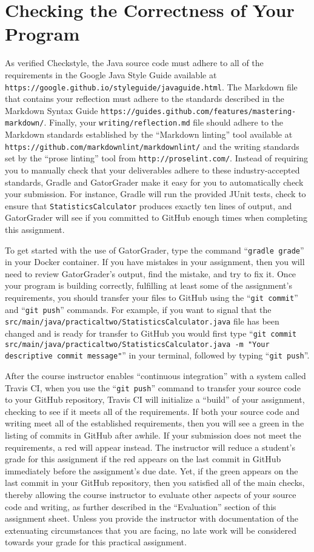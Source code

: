 \documentclass[11pt]{article}
\newcommand{\mainprogram}{\lstinline{StatisticsCalculator}}
\newcommand{\mainprogramsource}{\lstinline{src/main/java/practicaltwo/StatisticsCalculator.java}}
\newcommand{\reflection}{\lstinline{writing/reflection.md}}
\newcommand{\gatorgraderstart}{\command{gradle grade}}
\newcommand{\gitcommit}{\command{git commit}}
\newcommand{\gitpush}{\command{git push}}
\newcommand{\gitcommitmainprogram}{\command{git commit src/main/java/practicaltwo/StatisticsCalculator.java -m "Your
descriptive commit message"}}
\newcommand{\command}[1]{``\lstinline{#1}''}
\newcommand{\url}[1]{\lstinline{#1}}
\newcommand{\step}[1]{``{#1}''}
\newcommand{\checkmark}{\ding{51}}
\newcommand{\naughtmark}{\ding{55}}
\begin{document}
\section*{Checking the Correctness of Your Program}

As verified Checkstyle, the Java source code must adhere to all of the
requirements in the Google Java Style Guide available at
\url{https://google.github.io/styleguide/javaguide.html}. The Markdown file that
contains your reflection must adhere to the standards described in the Markdown
Syntax Guide \url{https://guides.github.com/features/mastering-markdown/}.
Finally, your \reflection{} file should adhere to the Markdown standards
established by the \step{Markdown linting} tool available at
\url{https://github.com/markdownlint/markdownlint/} and the writing standards
set by the \step{prose linting} tool from \url{http://proselint.com/}. Instead
of requiring you to manually check that your deliverables adhere to these
industry-accepted standards, Gradle and GatorGrader make it easy for you to
automatically check your submission. For instance, Gradle will run the provided
JUnit tests, check to ensure that \mainprogram{} produces exactly ten lines of
output, and GatorGrader will see if you committed to GitHub enough times when
completing this assignment.

To get started with the use of GatorGrader, type the command \gatorgraderstart{}
in your Docker container. If you have mistakes in your assignment, then you will
need to review GatorGrader's output, find the mistake, and try to fix it. Once
your program is building correctly, fulfilling at least some of the assignment's
requirements, you should transfer your files to GitHub using the \gitcommit{}
and \gitpush{} commands. For example, if you want to signal that the
\mainprogramsource{} file has been changed and is ready for transfer to GitHub
you would first type \gitcommitmainprogram{} in your terminal, followed by
typing \gitpush{}.

After the course instructor enables \step{continuous integration} with a system
called Travis CI, when you use the \gitpush{} command to transfer your source
code to your GitHub repository, Travis CI will initialize a \step{build} of
your assignment, checking to see if it meets all of the requirements. If both
your source code and writing meet all of the established requirements, then you
will see a green \checkmark{} in the listing of commits in GitHub after awhile.
If your submission does not meet the requirements, a red \naughtmark{} will
appear instead. The instructor will reduce a student's grade for this
assignment if the red \naughtmark{} appears on the last commit in GitHub
immediately before the assignment's due date. Yet, if the green \checkmark{}
appears on the last commit in your GitHub repository, then you satisfied all of
the main checks, thereby allowing the course instructor to evaluate other
aspects of your source code and writing, as further described in the
\step{Evaluation} section of this assignment sheet. Unless you provide the
instructor with documentation of the extenuating circumstances that you are
facing, no late work will be considered towards your grade for this practical
assignment.
\end{document}
